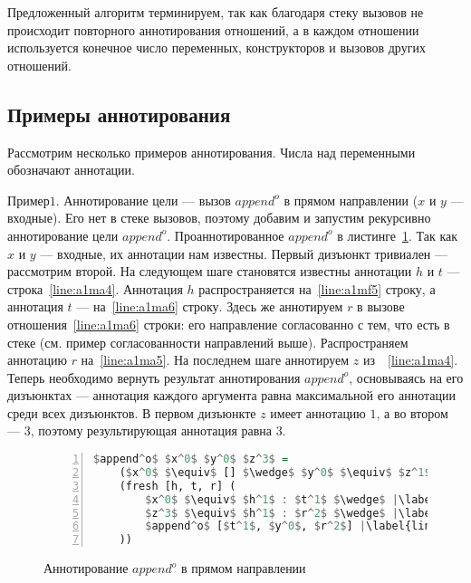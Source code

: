 \documentclass[conference,american,russian]{IEEEtran}
\begin{document}
Предложенный алгоритм терминируем, так как благодаря стеку вызовов не происходит повторного аннотирования отношений, а в каждом отношении используется конечное число переменных, конструкторов и вызовов других отношений.

\subsection{Примеры аннотирования}

Рассмотрим несколько примеров аннотирования.
Числа над переменными обозначают аннотации.

$Пример 1$. Аннотирование цели --- вызов $append^o$ в прямом направлении ($x$ и $y$ --- входные).
Его нет в стеке вызовов, поэтому добавим и запустим рекурсивно аннотирование цели $append^o$. Проаннотированное $append^o$ в листинге~\ref{lst:appendoANN1}.
Так как $x$ и $y$ --- входные, их аннотации нам известны.
Первый дизъюнкт тривиален --- рассмотрим второй.
На следующем шаге становятся известны аннотации $h$ и $t$ --- строка~\ref{line:a1ma4}.
Аннотация $h$ распространяется на~\ref{line:a1mf5} строку, а аннотация $t$ --- на~\ref{line:a1ma6} строку.
Здесь же аннотируем $r$ в вызове отношения~\ref{line:a1ma6} строки: его направление согласованно с тем, что есть в стеке (см. пример согласованности направлений выше).
Распространяем аннотацию $r$ на~\ref{line:a1ma5}.
На последнем шаге аннотируем $z$ из~~\ref{line:a1ma4}.
Теперь необходимо вернуть результат аннотирования $append^o$, основываясь на его дизъюнктах --- аннотация каждого аргумента равна максимальной его аннотации среди всех дизъюнктов.
В первом дизъюнкте $z$ имеет аннотацию $1$, а во втором --- $3$, поэтому результирующая аннотация равна $3$.

\begin{figure}[h!]
  \begin{center}
  \begin{minipage}{0.3\textwidth}
  \begin{lstlisting}[language=Haskell, frame=single, numbers=left,numberstyle=\small, escapechar=|]
  $append^o$ $x^0$ $y^0$ $z^3$ =
    ($x^0$ $\equiv$ [] $\wedge$ $y^0$ $\equiv$ $z^1$) $\vee$ |\label{line:a1ma2}|
    (fresh [h, t, r] (
        $x^0$ $\equiv$ $h^1$ : $t^1$ $\wedge$ |\label{line:a1ma4}|
        $z^3$ $\equiv$ $h^1$ : $r^2$ $\wedge$ |\label{line:a1ma5}|
        $append^o$ [$t^1$, $y^0$, $r^2$] |\label{line:a1ma6}|
    ))
    \end{lstlisting}
  \end{minipage}
  \end{center}
  \caption{Аннотирование $append^o$ в прямом направлении}
  \label{lst:appendoANN1}
\end{figure}
\end{document}
